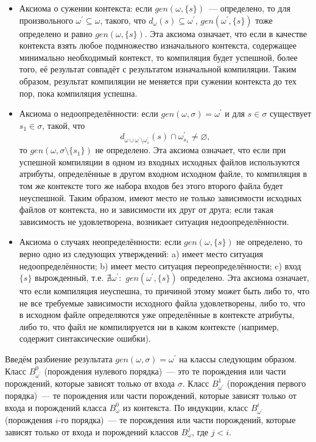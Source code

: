 \begin{itemize}
	\item Аксиома о сужении контекста: если $gen(\omega,\{s\})$~--- определено, то для произвольного $\omega^\prime\subseteq\omega$, такого, что $d_\omega(s)\subseteq\omega^\prime$, $gen(\omega^\prime, \{s\})$ тоже определено и равно $gen(\omega,\{s\})$. Эта аксиома означает, что если в качестве контекста взять любое подмножество изначального контекста, содержащее минимально необходимый контекст, то компиляция будет успешной, более того, её результат совпадёт с результатом изначальной компиляции. Таким образом, результат компиляции не меняется при сужении контекста до тех пор, пока компиляция успешна.
	
	\item Аксиома о недоопределённости: если $gen(\omega, \sigma) = \omega^\prime$ и для $s \in \sigma$ существует $s_1 \in \sigma$, такой, что $$d_{\omega \cup \omega^\prime \setminus \omega^\prime_s}(s) \cap \omega^\prime_{s_1} \neq \varnothing,$$ то $gen(\omega, \sigma \setminus \{s_1\})$ не определено. Эта аксиома означает, что если при успешной компиляции в одном из входных исходных файлов используются атрибуты, определённые в другом входном исходном файле, то компиляция в том же контексте того же набора входов без этого второго файла будет неуспешной. Таким образом, имеют место не только зависимости исходных файлов от контекста, но и зависимости их друг от друга; если такая зависимость не удовлетворена, возникает ситуация недоопределённости.
	
	\item Аксиома о случаях неопределённости: если $gen(\omega, \{s\})$ не определено, то верно одно из следующих утверждений: a) имеет место ситуация недоопределённости; b) имеет место ситуация переопределённости; c) вход $\{s\}$ вырожденный, т.е. $\nexists \omega^\prime:$ $gen(\omega^\prime, \{s\})$ определено. Эта аксиома означает, что если компиляция неуспешна, то причиной этому может быть либо то, что не все требуемые зависимости исходного файла удовлетворены, либо то, что в исходном файле определяются уже определённые в контексте атрибуты, либо то, что файл не компилируется ни в каком контексте (например, содержит синтаксические ошибки).
\end{itemize}

Введём разбиение результата $gen(\omega, \sigma) = \omega^\prime$ на классы следующим образом. Класс $B^0_{\omega^\prime}$ (порождения нулевого порядка)~--- это те порождения или части порождений, которые зависят только от входа $\sigma$. Класс $B^1_{\omega^\prime}$ (порождения первого порядка)~--- те порождения или части порождений, которые зависят только от входа и порождений класса $B^0_{\omega}$ из контекста. По индукции, класс $B^i_{\omega^\prime}$ (порождения $i$-го порядка)~--- те порождения или части порождений, которые зависят только от входа и порождений классов $B^j_{\omega}$, где $j < i$.

